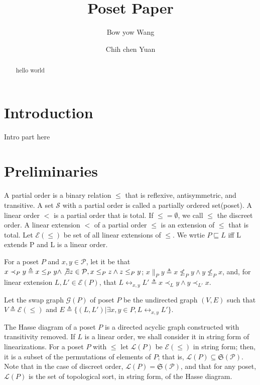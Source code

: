 \documentclass{llncs}
\begin{document}
\title{Poset Paper}
\author{Bow yow Wang \and Chih chen Yuan}
\maketitle

\begin{abstract}
hello world
\end{abstract}

\section{Introduction}
Intro part here

\section{Preliminaries}
A partial order is a binary relation $\leq$ that is reflexive, antisymmetric, and transitive. A set $\mathcal{S}$ with a partial order is called a partially ordered set(poset). A linear order $<$ is a partial order that is total. If $\leq = \emptyset$, we call $\leq$ the discreet order. A linear extension $<$ of a partial order $\leq$ is an extension of $\leq$ that is total. Let $\mathcal{E}(\leq)$ be set of all linear extensions of $\leq$. We wrtie $P \sqsubseteq L$ iff L extends P and L is a linear order.

For a poset $P$ and $x, y \in \mathcal{P}$, let it be that $x \prec_{P} y \triangleq x \leq_{P} y \wedge \not\exists z \in \mathcal{P}, x \leq_{P} z \wedge z \leq_{P} y$; $x \parallel_{P} y \triangleq x \not\leq_{P} y \wedge y \not\leq_{P} x$, and, for linear extension $L, L' \in \mathcal{E}(P)$, that $L \leftrightarrow_{x, y} L' \triangleq x \prec_{L} y \wedge y \prec_{L'} x$.

Let the swap graph $\mathcal{G}(P)$ of poset $P$ be the undirected graph $(V,E)$ such that $V \triangleq \mathcal{E}(\leq)$ and
$E \triangleq \{(L, L') | \exists x,y \in P, L \leftrightarrow_{x, y} L'\}$.

The Hasse diagram of a poset $P$ is a directed acyclic graph constructed with transitivity removed. If $L$ is a linear order, we shall consider it in string form of linearizations. For a poset $P$ with $\leq$ let $\mathcal{L}(P)$ be $\mathcal{E}(\leq)$ in string form; then, it is a subset of the permutations of elements of $P$; that is, $\mathcal{L}(P) \subseteq \mathfrak{S}(\mathcal{P})$. Note that in the case of discreet order, $\mathcal{L}(P) = \mathfrak{S}(\mathcal{P})$, and that for any poset, $\mathcal{L}(P)$ is the set of topological sort, in string form, of the Hasse diagram.
\end{document}
